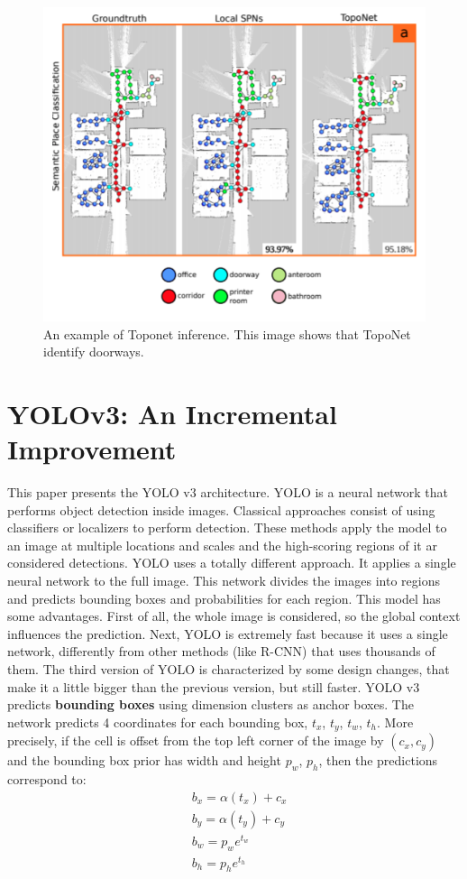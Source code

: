 \begin{figure}[h!]
	\centering
	\includegraphics[width=0.8\linewidth]{images/SPN_example.png}
	\caption{An example of Toponet inference. This image shows that TopoNet identify doorways.}
\end{figure}

\section{YOLOv3: An Incremental Improvement \cite{yolov3}}

This paper presents the YOLO v3 architecture. YOLO is a neural network that performs object detection inside images. Classical approaches consist of using classifiers or localizers to perform detection. These methods apply the model to an image at multiple locations and scales and the high-scoring regions of it ar considered detections. YOLO uses a totally different approach. It applies a single neural network to the full image. This network divides the images into regions and predicts bounding boxes and probabilities for each region. This model has some advantages. First of all, the whole image is considered, so the global context influences the prediction. Next, YOLO is extremely fast because it uses a single network, differently from other methods (like R-CNN) that uses thousands of them. The third version of YOLO is characterized by some design changes, that make it a little bigger than the previous version, but still faster. YOLO v3  predicts \textbf{bounding boxes} using dimension clusters as anchor boxes. The
network predicts 4 coordinates for each bounding box, $t_x$,
$t_y$, $t_w$, $t_h$. More precisely, if the cell is offset from the top left corner of the
image by $(c_x, c_y)$ and the bounding box prior has width and
height $p_w$, $p_h$, then the predictions correspond to: 
\begin{align*}
&b_x = \alpha(t_x) + c_x \nonumber \\
&b_y = \alpha(t_y) + c_y \nonumber \\ 
&b_w = p_w e^{t_w} \nonumber \\  
&b_h = p_he^{t_h} \nonumber 
\end{align*}

